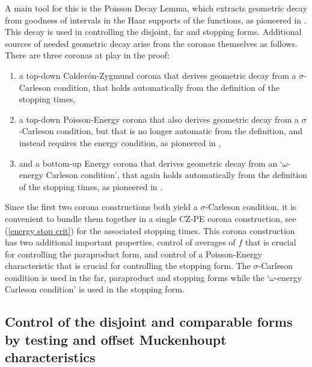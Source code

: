 \documentclass{amsart}%
\theoremstyle{plain}
\numberwithin{equation}{section}
\begin{document}
A main tool for this is the Poisson Decay Lemma, which extracts geometric
decay from goodness of intervals in the Haar supports of the functions, as
pioneered in \cite{NTV3}. This decay is used in controlling the disjoint, far
and stopping forms. Additional sources of needed geometric decay arise from
the coronas themselves as follows. There are three coronas at play in the proof:

\begin{enumerate}
\item a top-down Calder\'{o}n-Zygmund corona that derives geometric decay from
a $\sigma$-Carleson condition, that holds automatically from the definition of
the stopping times,

\item a top-down Poisson-Energy corona that also derives geometric decay from
a $\sigma$-Carleson condition, but that is no longer automatic from the
definition, and instead requires the energy condition, as pioneered in
\cite{LaSaUr2},

\item and a bottom-up Energy corona that derives geometric decay from an
`$\omega$-energy Carleson condition', that again holds automatically from the
definition of the stopping times, as pioneered in \cite{Lac}.
\end{enumerate}

Since the first two corona constructions both yield a $\sigma$-Carleson
condition, it is convenient to bundle them together in a single CZ-PE corona
construction, see (\ref{energy stop crit}) for the associated stopping times.
This corona construction has two additional important properties, control of
averages of $f$ that is crucial for controlling the paraproduct form, and
control of a Poisson-Energy characteristic that is crucial for controlling the
stopping form. The $\sigma$-Carleson condition is used in the far, paraproduct
and stopping forms while the `$\omega$-energy Carleson condition' is used in
the stopping form.

\subsection{Control of the disjoint and comparable forms by testing and offset
Muckenhoupt characteristics}
\end{document}
